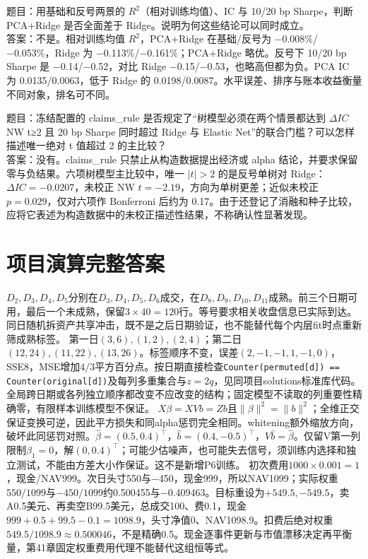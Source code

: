 \clearpage
{}
题目：用基础和反号两景的 \(R^2\)（相对训练均值）、IC 与 10/20 bp Sharpe，判断 PCA+Ridge 是否全面差于 Ridge。说明为何这些结论可以同时成立。\\
答案：不是。相对训练均值 \(R^2\)，PCA+Ridge 在基础/反号为 −0.008\%/−0.053\%，Ridge 为 −0.113\%/−0.161\%；PCA+Ridge 略优。反号下 10/20 bp Sharpe 是 −0.14/−0.52，对比 Ridge −0.15/−0.53，也略高但都为负。PCA IC 为 0.0135/0.0063，低于 Ridge 的 0.0198/0.0087。水平误差、排序与账本收益衡量不同对象，排名可不同。

\clearpage
{}
题目：冻结配置的 claims\_rule 是否规定了“树模型必须在两个情景都达到 \(\Delta IC\) NW t≥2 且 20 bp Sharpe 同时超过 Ridge 与 Elastic Net”的联合门槛？可以怎样描述唯一绝对 t 值超过 2 的主比较？\\
答案：没有。claims\_rule 只禁止从构造数据提出经济或 alpha 结论，并要求保留零与负结果。六项树模型主比较中，唯一 \(|t|>2\) 的是反号单树对 Ridge：\(\Delta IC=-0.0207\)，未校正 NW \(t=-2.19\)，方向为单树更差；近似未校正 \(p=0.029\)，仅对六项作 Bonferroni 后约为 0.17。由于还登记了消融和种子比较，应将它表述为构造数据中的未校正描述性结果，不称确认性显著发现。


\clearpage\section*{项目演算完整答案}
$D_2,D_3,D_4,D_5$分别在$D_3,D_4,D_5,D_6$成交，在$D_8,D_9,D_{10},D_{11}$成熟。前三个日期可用，最后一个未成熟，保留$3\times40=120$行。等号要求相关收盘信息已实际到达。同日随机拆资产共享冲击，既不是之后日期验证，也不能替代每个内层fit时点重新筛成熟标签。
第一日$(3,6),(1,2),(2,4)$；第二日$(12,24),(11,22),(13,26)$。标签顺序不变，误差$(2,-1,-1,1,-1,0)$，SSE8，MSE增加$4/3$平方百分点。按日期直接检查\texttt{Counter(permuted[d]) == Counter(original[d])}及每列多重集合与$z=2q$，见同项目solutions标准库代码。全局跨日期或各列独立顺序都改变不应改变的结构；固定模型不读取的列重要性精确零，有限样本训练模型不保证。
\clearpage
{}
$X\beta=XVb=Zb$且$\|\beta\|^2=\|b\|^2$；全维正交保证变换可逆，因此平方损失和同alpha惩罚完全相同。whitening额外缩放方向，破坏此同惩罚对照。$\hat\beta=(0.5,0.4)^\top$，$\hat b=(0.4,-0.5)^\top$，$V\hat b=\hat\beta$。仅留V第一列限制$\beta_1=0$，解$(0,0.4)^\top$；可能少估噪声，也可能失去信号，须训练内选择和独立测试，不能由方差大小作保证。这不是新增P6训练。
初次费用$1000\times0.001=1$，现金/NAV999。次日头寸550与−450，现金999，所以NAV1099；实际权重$550/1099$与$-450/1099$约0.500455与−0.409463。目标重设为$+549.5,-549.5$，卖A0.5美元、再卖空B99.5美元，总成交100、费0.1，现金$999+0.5+99.5-0.1=1098.9$，头寸净值0、NAV1098.9。扣费后绝对权重$549.5/1098.9\approx0.500046$，不是精确0.5。现金逐事件更新与市值漂移决定再平衡量，第41章固定权重费用代理不能替代这组恒等式。
